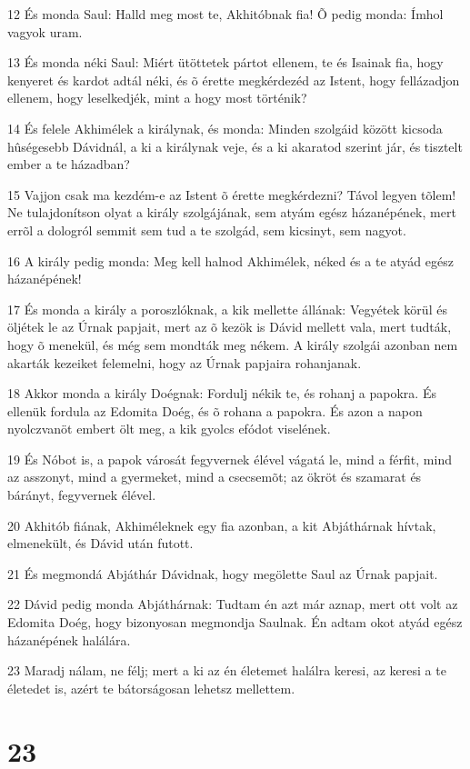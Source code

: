 \par 12 És monda Saul: Halld meg most te, Akhitóbnak fia! Õ pedig monda: Ímhol vagyok uram.
\par 13 És monda néki Saul: Miért ütöttetek pártot ellenem, te és Isainak fia, hogy kenyeret és kardot adtál néki, és õ érette megkérdezéd az Istent, hogy fellázadjon ellenem, hogy leselkedjék, mint a hogy most történik?
\par 14 És felele Akhimélek a királynak, és monda: Minden szolgáid között kicsoda hûségesebb Dávidnál, a ki a királynak veje, és a ki akaratod szerint jár, és tisztelt ember a te házadban?
\par 15 Vajjon csak ma kezdém-e az Istent õ érette megkérdezni? Távol legyen tõlem! Ne tulajdonítson olyat a király szolgájának, sem atyám egész házanépének, mert errõl a dologról semmit sem tud a te szolgád, sem kicsinyt, sem nagyot.
\par 16 A király pedig monda: Meg kell halnod Akhimélek, néked és a te atyád egész házanépének!
\par 17 És monda a király a poroszlóknak, a kik mellette állának: Vegyétek körül és öljétek le az Úrnak papjait, mert az õ kezök is Dávid mellett vala, mert tudták, hogy õ menekül, és még sem mondták meg nékem. A király szolgái azonban nem akarták kezeiket felemelni, hogy az Úrnak papjaira rohanjanak.
\par 18 Akkor monda a király Doégnak: Fordulj nékik te, és rohanj a papokra. És ellenük fordula az Edomita Doég, és õ rohana a papokra. És azon a napon nyolczvanöt embert ölt meg, a kik gyolcs efódot viselének.
\par 19 És Nóbot is, a papok városát fegyvernek élével vágatá le, mind a férfit, mind az asszonyt, mind a gyermeket, mind a csecsemõt; az ökröt és szamarat és bárányt, fegyvernek élével.
\par 20 Akhitób fiának, Akhiméleknek egy fia azonban, a kit Abjáthárnak hívtak, elmenekült, és Dávid után futott.
\par 21 És megmondá Abjáthár Dávidnak, hogy megölette Saul az Úrnak papjait.
\par 22 Dávid pedig monda Abjáthárnak: Tudtam én azt már aznap, mert ott volt az Edomita Doég, hogy bizonyosan megmondja Saulnak. Én adtam okot atyád egész házanépének halálára.
\par 23 Maradj nálam, ne félj; mert a ki az én életemet halálra keresi, az keresi a te életedet is, azért te bátorságosan lehetsz mellettem.

\chapter{23}

